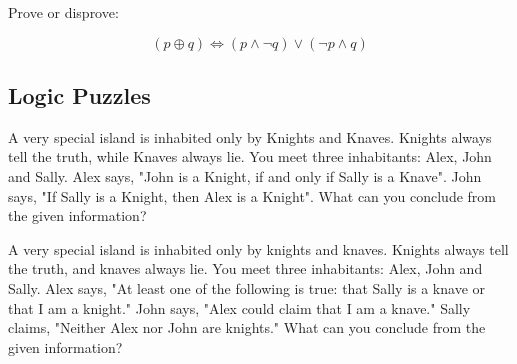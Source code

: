 \begin{question}
    Prove or disprove:

    \[
        (p \oplus q) \Leftrightarrow (p \wedge \neg q) \vee (\neg p \wedge q)
    \]
\end{question}

\subsection{Logic Puzzles}

\begin{question}
    A very special island is inhabited only by Knights and Knaves. Knights
    always tell the truth, while Knaves always lie. You meet three inhabitants:
    Alex, John and Sally. Alex says, "John is a Knight, if and only if Sally is
    a Knave". John says, "If Sally is a Knight, then Alex is a Knight". What
    can you conclude from the given information?
\end{question}

\begin{question}
    A very special island is inhabited only by knights and knaves. Knights
    always tell the truth, and knaves always lie. You meet three inhabitants:
    Alex, John and Sally. Alex says, "At least one of the following is true:
    that Sally is a knave or that I am a knight." John says, "Alex could claim
    that I am a knave." Sally claims, "Neither Alex nor John are knights." What
    can you conclude from the given information?
\end{question}
